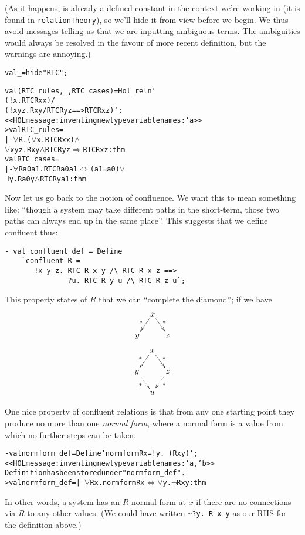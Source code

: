 (As it happens,  is already a defined constant in the context
we're working in (it is found in \texttt{relationTheory}), so we'll
hide it from view before we begin.  We thus avoid messages telling us
that we are inputting ambiguous terms.  The ambiguities would always
be resolved in the favour of more recent definition, but the warnings
are annoying.)
\begin{session}
\begin{alltt}
val _ = hide "RTC";

val (RTC_rules, _, RTC_cases) = Hol_reln `
    (!x.     RTC R x x) /\bs
    (!x y z. R x y /\bs RTC R y z ==> RTC R x z)`;
<<HOL message: inventing new type variable names: 'a>>
> val RTC_rules =
    |- \(\forall\)R. (\(\forall\)x. RTC R x x) \(\land\)
           \(\forall\)x y z. R x y \(\land\) RTC R y z \(\Rightarrow\) RTC R x z : thm
  val RTC_cases =
    |- \(\forall\)R a0 a1. RTC R a0 a1 \(\Leftrightarrow\) (a1 = a0) \(\lor\)
                                \(\exists\)y. R a0 y \(\land\) RTC R y a1 : thm
\end{alltt}
\end{session}
Now let us go back to the notion of confluence.  We want this to mean
something like: ``though a system may take different paths in the
short-term, those two paths can always end up in the same place''.
This suggests that we define confluent thus:
\begin{session}
\begin{verbatim}
- val confluent_def = Define
    `confluent R =
       !x y z. RTC R x y /\ RTC R x z ==>
               ?u. RTC R y u /\ RTC R z u`;
\end{verbatim}
\end{session}
This property states of $R$ that we can ``complete the diamond'';
if we have
\[\xymatrix @R=5mm @C=2.5mm {
 & x \ar[dl]_{*} \ar[dr]^{*} & \\
y & & z }\]
\[\xymatrix @R=5mm @C=2.5mm {
& x \ar[dl]_{*} \ar[dr]^{*} & \\
y \ar@{.>}[dr]_{*} & & z \ar@{.>}[dl]^{*} \\
& u}\]

One nice property of confluent relations is that from any one starting
point they produce no more than one \emph{normal form}, where a normal
form is a value from which no further steps can be taken.
\begin{session}
\begin{alltt}
- val normform_def = Define`normform R x = !y. ~(R x y)`;
<<HOL message: inventing new type variable names: 'a, 'b>>
Definition has been stored under "normform_def".
> val normform_def = |- \(\forall\)R x. normform R x \(\Leftrightarrow\) \(\forall\)y. \(\neg\)R x y : thm
\end{alltt}
\end{session}
In other words, a system has an $R$-normal form at $x$ if there are no
connections via $R$ to any other values.  (We could have written
\verb!~?y. R x y! as our RHS for the definition above.)

